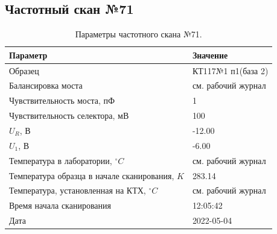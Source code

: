 \subsection{Частотный скан №71}
\begin{table}[!ht]
    \centering
    \caption{Параметры частотного скана №71.}
    \begin{tabular}{|l|l|}
        \hline
        Параметр                                       & Значение                  \\ \hline
        Образец                                        & КТ117№1 п1(база 2)        \\ \hline
        Балансировка моста                             & см. рабочий журнал        \\ \hline
        Чувствительность моста, пФ                     & 1                         \\ \hline
        Чувствительность селектора, мВ                 & 100                       \\ \hline
        $U_R$, В                                       & -12.00                    \\ \hline
        $U_1$, В                                       & -6.00                     \\ \hline
        Температура в лаборатории, $^\circ C$          & см. рабочий журнал        \\ \hline
        Температура образца в начале сканирования, $K$ & 283.14                    \\ \hline
        Температура, установленная на КТХ, $^\circ C$  & см. рабочий журнал        \\ \hline
        Время начала сканирования                      & 12:05:42                  \\ \hline
        Дата                                           & 2022-05-04                \\ \hline
    \end{tabular}
    \label{table:frequency_scan_71}
\end{table}

